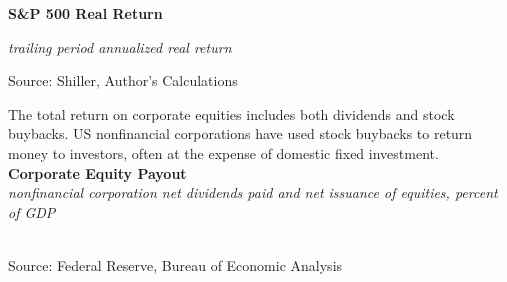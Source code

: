 \documentclass{report}
\makeatletter
\newcommand{\tbllink}[1]{\href{https://raw.githubusercontent.com/bdecon/US-chartbook/master/chartbook/data/#1}{\faTable}}
\newcommand*\short[1]{\expandafter\@gobbletwo\number\numexpr#1\relax}
\newcommand{\sbar}[4]{
		\addplot[ybar stacked, bar width=2.6pt, draw opacity=0, fill=#1] 
			table [x=#2, y=#3, col sep=comma]{#4};}
\newcommand{\dateaxisticks}{
		date coordinates in=x, axis line style={draw=none},
		xmax={2020-08-10},
		max space between ticks=40,	    
		xtick={{1990-01-01}, {1992-01-01}, {1994-01-01}, 
			{1996-01-01}, {1998-01-01}, {2000-01-01}, 
			{2002-01-01}, {2004-01-01}, {2006-01-01},
			{2008-01-01}, {2010-01-01}, {2012-01-01}, {2014-01-01},
		    {2016-01-01}, {2018-01-01}, {2020-01-01}},
		minor xtick={{1989-01-01}, {1991-01-01}, {1993-01-01},
			{1995-01-01}, {1997-01-01}, {1999-01-01}, 
			{2001-01-01}, {2003-01-01}, {2005-01-01}, {2007-01-01},
		    {2009-01-01}, {2011-01-01}, {2013-01-01}, {2015-01-01},
		    {2017-01-01}, {2019-01-01}},
		enlarge y limits={0.06}, enlarge x limits={0.01},
		}
\newcommand{\bbar}[2]{extra #1 ticks = {{#2}}, extra #1 tick labels = ,
		extra #1 tick style = {grid=major, grid style={thick, black!25}},}
\newcommand{\thickline}[4]{\addplot[ultra thick, no markers, color=#1] 
		table [x=#2, y=#3, col sep=comma] {#4};	}
\newcommand{\rbars}{
		\fill[color=black!10] (axis cs:{1990-07-01},\pgfkeysvalueof{/pgfplots/ymin}) rectangle 
			(axis cs:{1991-03-01}, \pgfkeysvalueof{/pgfplots/ymax});
		\fill[color=black!10] (axis cs:{2007-12-01},\pgfkeysvalueof{/pgfplots/ymin}) rectangle 
			(axis cs:{2009-07-01}, \pgfkeysvalueof{/pgfplots/ymax});
		\fill[color=black!10] (axis cs:{2001-03-01},\pgfkeysvalueof{/pgfplots/ymin}) rectangle 
			(axis cs:{2001-11-01}, \pgfkeysvalueof{/pgfplots/ymax});
		\fill[color=black!10] (axis cs:{2020-02-01},\pgfkeysvalueof{/pgfplots/ymin}) rectangle 
			(axis cs:{2020-09-01}, \pgfkeysvalueof{/pgfplots/ymax});}
\makeatother
\begin{document}
{{{{{{{{{\begin{minipage}{0.76\textwidth}
\normalsize \textbf{S\&P 500 Real Return}

\footnotesize{\textit{trailing period annualized real return}}

\hspace*{-2mm} 

\footnotesize{Source: Shiller, Author's Calculations} \hfill \tbllink{sp500rr20.csv}


\end{minipage}

\newpage

\begin{minipage}{0.76\textwidth}

\small The total return on corporate equities includes both dividends and stock buybacks. US nonfinancial corporations have used stock buybacks to return money to investors, often at the expense of domestic fixed investment. \\

\noindent \normalsize \textbf{Corporate Equity Payout}\\
\footnotesize{\textit{nonfinancial corporation net dividends paid and net issuance of equities, percent of GDP}}\\
\noindent \hspace*{-2mm} \\
\footnotesize{Source: Federal Reserve, Bureau of Economic Analysis} \hfill \tbllink{eq_payout.csv}


\end{minipage}}}}}}}}}}
\end{document}
